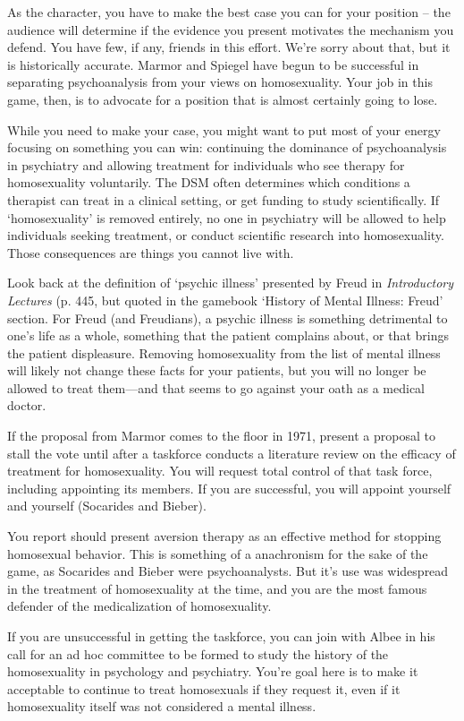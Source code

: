 \begin{refsection}
As the character, you have to make the best case you can for your position – the audience will determine if the evidence you present motivates the mechanism you defend. You have few, if any, friends in this effort. We're sorry about that, but it is historically accurate. Marmor and Spiegel have begun to be successful in separating psychoanalysis from your views on homosexuality. Your job in this game, then, is to advocate for a position that is almost certainly going to lose. 

While you need to make your case, you might want to put most of your energy focusing on something you can win: continuing the dominance of psychoanalysis in psychiatry and allowing treatment for individuals who see therapy for homosexuality voluntarily. The DSM often determines which conditions a therapist can treat in a clinical setting, or get funding to study scientifically. If `homosexuality' is removed entirely, no one in psychiatry will be allowed to help individuals seeking treatment, or conduct scientific research into homosexuality. Those consequences are things you cannot live with. 

Look back at the definition of `psychic illness' presented by Freud in \emph{Introductory Lectures} (p. 445, but quoted in the gamebook `History of Mental Illness: Freud' section. For Freud (and Freudians), a psychic illness is something detrimental to one's life as a whole, something that the patient complains about, or that brings the patient displeasure. Removing homosexuality from the list of mental illness will likely not change these facts for your patients, but you will no longer be allowed to treat them---and that seems to go against your oath as a medical doctor.

If the proposal from Marmor comes to the floor in 1971, present a proposal to stall the vote until after a taskforce conducts a literature review on the efficacy of treatment for homosexuality. You will request total control of that task force, including appointing its members. If you are successful, you will appoint yourself and yourself (Socarides and Bieber). 

You report should present aversion therapy as an effective method for stopping homosexual behavior. This is something of a anachronism for the sake of the game, as Socarides and Bieber were psychoanalysts. But it's use was widespread in the treatment of homosexuality at the time, and you are the most famous defender of the medicalization of homosexuality.

If you are unsuccessful in getting the taskforce, you can join with Albee in his call for an ad hoc committee to be formed to study the history of the homosexuality in psychology and psychiatry. You're goal here is to make it acceptable to continue to treat homosexuals if they request it, even if it homosexuality itself was not considered a mental illness.


\end{refsection}
